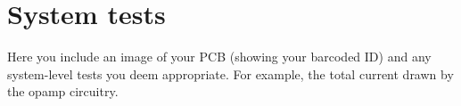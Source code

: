 \chapter{System tests}
Here you include an image of your PCB (showing your barcoded ID) and any system-level tests you deem appropriate. For example, the total current drawn by the opamp circuitry. 










